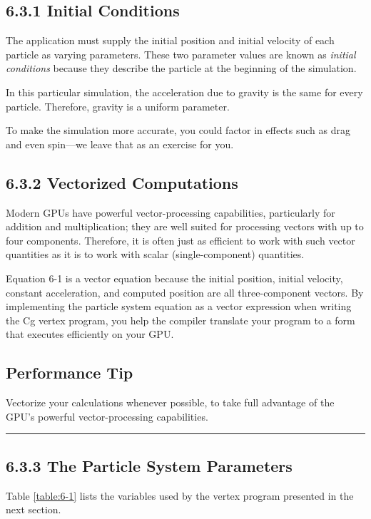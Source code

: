 \documentclass[../main.tex]{subfiles}
\begin{document}
\subsection{6.3.1 Initial Conditions}

The application must supply the initial position and initial velocity of each particle as varying parameters. These two parameter values are known as \textit{initial conditions} because they describe the particle at the beginning of the simulation.

In this particular simulation, the acceleration due to gravity is the same for every particle. Therefore, gravity is a uniform parameter.

To make the simulation more accurate, you could factor in effects such as drag and even spin—we leave that as an exercise for you.

\subsection{6.3.2 Vectorized Computations}

Modern GPUs have powerful vector-processing capabilities, particularly for addition and multiplication; they are well suited for processing vectors with up to four components. Therefore, it is often just as efficient to work with such vector quantities as it is to work with scalar (single-component) quantities.

Equation 6-1 is a vector equation because the initial position, initial velocity, constant acceleration, and computed position are all three-component vectors. By implementing the particle system equation as a vector expression when writing the Cg vertex program, you help the compiler translate your program to a form that executes efficiently on your GPU.

\subsection*{Performance Tip}

Vectorize your calculations whenever possible, to take full advantage of the GPU's powerful vector-processing capabilities.
\hrule

\subsection{6.3.3 The Particle System Parameters}

Table \ref{table:6-1} lists the variables used by the vertex program presented in the next section.
\end{document}
